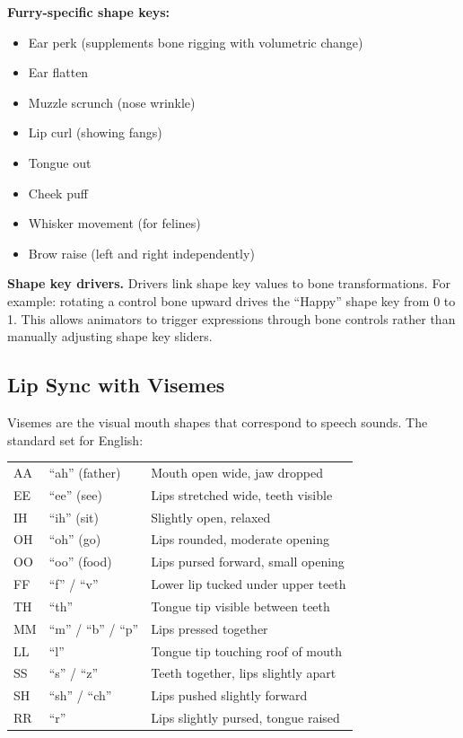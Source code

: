 \textbf{Furry-specific shape keys:}

\begin{itemize}[leftmargin=2em]
  \item Ear perk (supplements bone rigging with volumetric change)
  \item Ear flatten
  \item Muzzle scrunch (nose wrinkle)
  \item Lip curl (showing fangs)
  \item Tongue out
  \item Cheek puff
  \item Whisker movement (for felines)
  \item Brow raise (left and right independently)
\end{itemize}

\textbf{Shape key drivers.} Drivers link shape key values to bone transformations. For example: rotating a control bone upward drives the ``Happy'' shape key from 0 to 1. This allows animators to trigger expressions through bone controls rather than manually adjusting shape key sliders.


\subsection{Lip Sync with Visemes}

Visemes are the visual mouth shapes that correspond to speech sounds. The standard set for English:

\begin{center}
\begin{tabularx}{\textwidth}{C{1.2cm}C{2.5cm}X}
\toprule
{}
 &  &  \\
\midrule
AA & ``ah'' (father) & Mouth open wide, jaw dropped \\
EE & ``ee'' (see) & Lips stretched wide, teeth visible \\
IH & ``ih'' (sit) & Slightly open, relaxed \\
OH & ``oh'' (go) & Lips rounded, moderate opening \\
OO & ``oo'' (food) & Lips pursed forward, small opening \\
FF & ``f'' / ``v'' & Lower lip tucked under upper teeth \\
TH & ``th'' & Tongue tip visible between teeth \\
MM & ``m'' / ``b'' / ``p'' & Lips pressed together \\
LL & ``l'' & Tongue tip touching roof of mouth \\
SS & ``s'' / ``z'' & Teeth together, lips slightly apart \\
SH & ``sh'' / ``ch'' & Lips pushed slightly forward \\
RR & ``r'' & Lips slightly pursed, tongue raised \\
\bottomrule
\end{tabularx}
\end{center}

